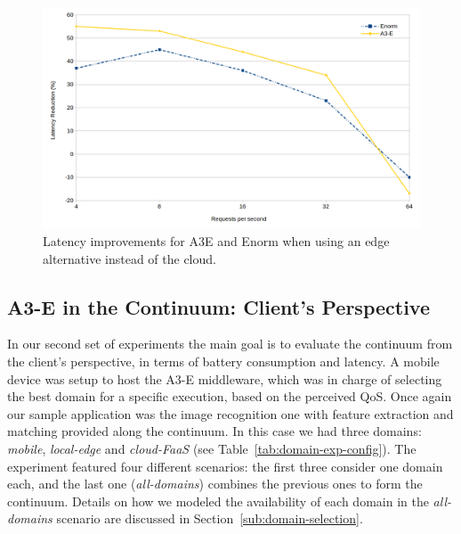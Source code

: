 \begin{figure}	
	\centering
	\includegraphics[width=.9\textwidth]{figs/a3e-enorm-latency}
	\vspace{-.3cm}
	\caption{Latency improvements for A3E and Enorm when using an edge alternative instead of the cloud.}
	\label{fig:a3e-enorm-latency}
\end{figure}


\subsection{A3-E in the Continuum: Client's Perspective} 
\label{sub:exp-a3e-continuum}

In our second set of experiments the main goal is to evaluate the continuum from the client's perspective, in terms of battery consumption and latency. A mobile device was setup to host the A3-E middleware, which was in charge of selecting the best domain for a specific execution, based on the perceived QoS. 
Once again our sample application was the image recognition one with feature extraction and matching provided along the continuum. In this case we had three domains: \textit{mobile}, \textit{local-edge} and \textit{cloud-FaaS} (see Table~\ref{tab:domain-exp-config}). The experiment featured four different scenarios: the first three consider one domain each, and the last one (\textit{all-domains}) combines the previous ones to form the continuum. Details on how we modeled the availability of each domain in the \textit{all-domains} scenario are discussed in Section~\ref{sub:domain-selection}.

